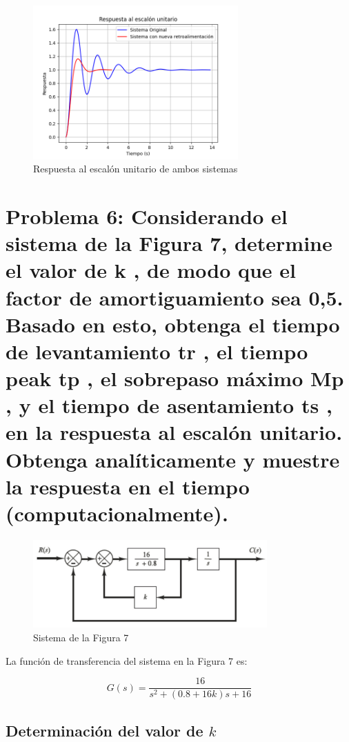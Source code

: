 \documentclass[10pt]{article}
\theoremstyle{definition}
\theoremstyle{remark}
\theoremstyle{definition}
\numberwithin{equation}{prob}
\begin{document}
\begin{figure}[h]
	\centering
	\includegraphics[width=0.7\textwidth]{./figures/Figura 6 ejercicio 5.png}
	\caption{Respuesta al escalón unitario de ambos sistemas}
\end{figure}

\newpage

\section{Problema 6: Considerando el sistema de la Figura 7, determine el valor de k , de modo que el factor de
  amortiguamiento sea 0,5. Basado en esto, obtenga el tiempo de levantamiento tr , el tiempo
  peak tp , el sobrepaso máximo Mp , y el tiempo de asentamiento ts , en la respuesta al escalón
  unitario. Obtenga analíticamente y muestre la respuesta en el tiempo (computacionalmente).}

\begin{figure}[h]
	\centering
	\includegraphics[width=0.8\textwidth]{./figures/Figura 7 ejercicio 6.png}
	\caption{Sistema de la Figura 7}
\end{figure}


La función de transferencia del sistema en la Figura 7 es:

\[
G(s) = \frac{16}{s^2 + (0.8 + 16k)s + 16}
\]

\subsection{Determinación del valor de \texorpdfstring{\(k\)}{k}}
\end{document}
